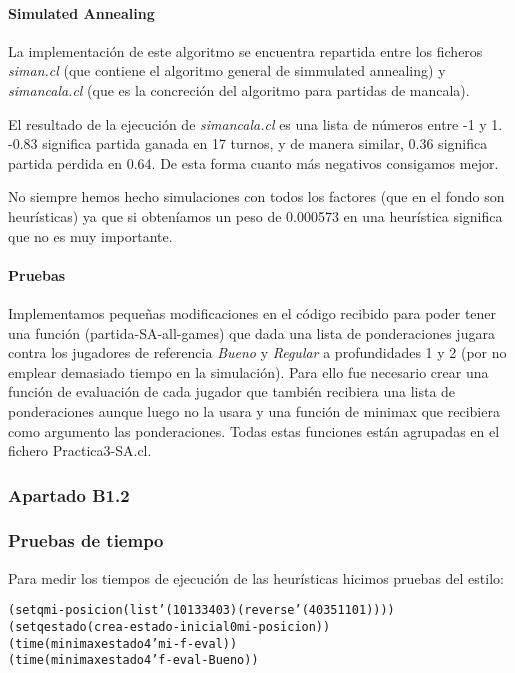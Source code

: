 \documentclass[nochap]{apuntes}
\begin{document}
\paragraph{Simulated Annealing}
La implementación de este algoritmo se encuentra repartida entre los ficheros \textit{siman.cl} (que contiene el algoritmo general de simmulated annealing) y \textit{simancala.cl} (que es la concreción del algoritmo para partidas de mancala).

El resultado de la ejecución de \textit{simancala.cl} es una lista de números entre -1 y 1. -0.83 significa partida ganada en 17 turnos, y de manera similar, 0.36 significa partida perdida en 0.64. De esta forma cuanto más negativos consigamos mejor. 

No siempre hemos hecho simulaciones con todos los factores (que en el fondo son heurísticas) ya que si obteníamos un peso de 0.000573 en una heurística significa que no es muy importante. 

\paragraph{Pruebas}

Implementamos pequeñas modificaciones en el código recibido para poder tener una función (partida-SA-all-games) que dada una lista de ponderaciones jugara contra los jugadores de referencia \textit{Bueno} y \textit{Regular} a profundidades 1 y 2 (por no emplear demasiado tiempo en la simulación). Para ello fue necesario crear una función de evaluación de cada jugador que también recibiera una lista de ponderaciones aunque luego no la usara y una función de minimax que recibiera como argumento las ponderaciones. Todas estas funciones están agrupadas en el fichero Practica3-SA.cl. 




\subsubsection*{Apartado B1.2}
\subsubsection*{Pruebas de tiempo}
Para medir los tiempos de ejecución de las heurísticas hicimos pruebas del estilo:
\begin{alltt}
(setq mi-posicion (list '(1 0 1 3 3 4 0 3) (reverse '(4 0 3 5 1 1 0 1))))
(setq estado (crea-estado-inicial 0 mi-posicion))
(time (minimax estado 4 'mi-f-eval))
(time (minimax estado 4 'f-eval-Bueno))
\end{alltt}
\end{document}
